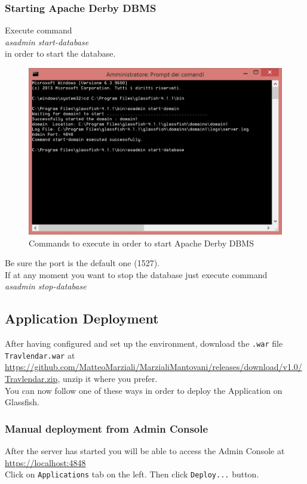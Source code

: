 \subsubsection{Starting Apache Derby DBMS}
Execute command \\
\textit{asadmin start-database} \\ in order to start the database. 
\begin{figure}[H]
\begin{center}
		\includegraphics[width=1.1\textwidth]{images/asadmindatabase}
		\caption{Commands to execute in order to start Apache Derby DBMS}
		
\end{center}
\end{figure}
Be sure the port is the default one (1527). \\
If at any moment you want to stop the database just execute command \\
\textit{asadmin stop-database}


\subsection{Application Deployment}
After having configured and set up the environment, download the \texttt{.war} file \texttt{Travlendar.war} at \\
\href{url}{https://github.com/MatteoMarziali/MarzialiMantovani/releases/download/v1.0/Travlendar.zip}, unzip it where you prefer.
\\You can now follow one of these ways in order to deploy the Application on Glassfish.

\subsubsection{Manual deployment from Admin Console}
After the server has started you will be able to access the Admin Console at  \\
\href{url}{https://localhost:4848}
\\Click on \texttt{Applications} tab on the left. Then click \texttt{Deploy...} button.

